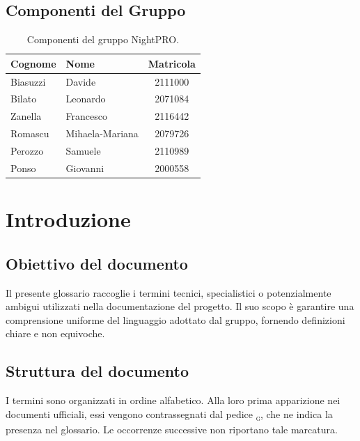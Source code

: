 \documentclass[a4paper, 11pt, oneside]{scrartcl} %
\begin{document}
\subsection{Componenti del Gruppo}

\begin{table}[h!]
    \centering
    \renewcommand{\arraystretch}{1.2} %
    \begin{tabular}{@{}llc@{}}
        \toprule
        \textbf{Cognome} & \textbf{Nome}   & \textbf{Matricola} \\
        \midrule
        Biasuzzi         & Davide          & 2111000            \\
        Bilato           & Leonardo        & 2071084            \\
        Zanella          & Francesco       & 2116442            \\
        Romascu          & Mihaela-Mariana & 2079726            \\
        Perozzo          & Samuele         & 2110989            \\
        Ponso            & Giovanni        & 2000558            \\
        \bottomrule
    \end{tabular}
    \caption{Componenti del gruppo NightPRO.}
\end{table}



\section{Introduzione}

\subsection{Obiettivo del documento}
Il presente glossario raccoglie i termini tecnici, specialistici o potenzialmente ambigui utilizzati nella documentazione del progetto.
Il suo scopo è garantire una comprensione uniforme del linguaggio adottato dal gruppo, fornendo definizioni chiare e non equivoche.
\subsection{Struttura del documento}
I termini sono organizzati in ordine alfabetico.
Alla loro prima apparizione nei documenti ufficiali, essi vengono contrassegnati dal pedice \textsubscript{\textsc{g}}, che ne indica la presenza nel glossario.
Le occorrenze successive non riportano tale marcatura.
\end{document}
